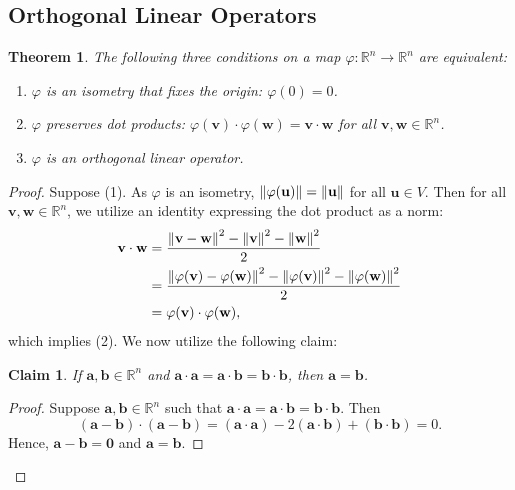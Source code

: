 \documentclass[11pt]{article}
\renewcommand{\vec}[1]{\mathbf{#1}}
\newtheorem{theorem}{Theorem}
\newtheorem{claim}{Claim}
\begin{document}
\subsection{Orthogonal Linear Operators}
\begin{adjustwidth}{1cm}{}
	\begin{theorem}
		The following three conditions on a map $\varphi : \mathbb{R}^{n} \to \mathbb{R}^{n}$ are equivalent:
		\begin{enumerate}
			\item $\varphi$ is an isometry that fixes the origin: $\varphi(0) = 0$.
			\item $\varphi$ preserves dot products: $\varphi(\vec{v}) \cdot \varphi(\vec{w}) = \vec{v} \cdot \vec{w}$ for all $\vec{v}, \vec{w} \in \mathbb{R}^{n}$.
			\item $\varphi$ is an orthogonal linear operator.
		\end{enumerate}
	\end{theorem}
	\begin{proof}
		Suppose (1). As $\varphi$ is an isometry, $\norm{\varphi(\vec{u})} = \norm{\vec{u}}$ for all $\vec{u} \in V$. Then for all $\vec{v}, \vec{w} \in \mathbb{R}^{n}$, we utilize an identity expressing the dot product as a norm:
		\begin{align*}
			\vec{v} \cdot \vec{w} &= \frac{\norm{\vec{v} - \vec{w}}^{2} - \norm{\vec{v}}^{2} - \norm{\vec{w}}^{2}}{2} \\
			&= \frac{\norm{\varphi(\vec{v}) - \varphi(\vec{w})}^{2} - \norm{\varphi(\vec{v})}^{2} - \norm{\varphi(\vec{w})}^{2}}{2} \\
			&= \varphi(\vec{v}) \cdot \varphi(\vec{w}),
		\end{align*}
		which implies (2). We now utilize the following claim:
		\begin{claim}
			If $\vec{a}, \vec{b} \in \mathbb{R}^{n}$ and $\vec{a} \cdot \vec{a} = \vec{a} \cdot \vec{b} = \vec{b} \cdot \vec{b}$, then $\vec{a} = \vec{b}$.
		\end{claim}
		\begin{adjustwidth}{1cm}{}
			\begin{proof}\renewcommand{\qedsymbol}{}
			Suppose $\vec{a}, \vec{b} \in \mathbb{R}^{n}$ such that $\vec{a} \cdot \vec{a} = \vec{a} \cdot \vec{b} = \vec{b} \cdot \vec{b}$. Then
			\[
				(\vec{a} - \vec{b}) \cdot (\vec{a} - \vec{b}) = (\vec{a} \cdot \vec{a}) - 2 (\vec{a} \cdot \vec{b}) + (\vec{b} \cdot \vec{b}) = 0.
			\]
			Hence, $\vec{a} - \vec{b} = \vec{0}$ and $\vec{a} = \vec{b}$.
			\end{proof}

\end{adjustwidth}
\end{proof}
\end{adjustwidth}
\end{document}
